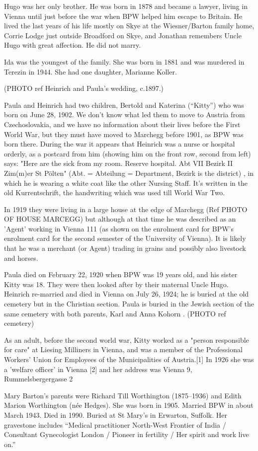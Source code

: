 Hugo was her only brother. He was born in 1878 and became a lawyer, living in Vienna until just
before the war when BPW helped him escape to Britain. He lived the last years of his life mostly
on Skye at the Wiesner/Barton family home, Corrie Lodge just outside Broadford on Skye, and
Jonathan remembers Uncle Hugo with great affection. He did not marry.

Ida was the youngest of the family. She was born in 1881 and was murdered in Terezin in 1944. She
had one daughter, Marianne Koller.

(PHOTO ref Heinrich and Paula's wedding, c.1897.)

Paula and Heinrich had two children, Bertold and Katerina (“Kitty”) who was born on June 28,
1902. We don’t know what led them to move to Austria from Czechoslovakia, and we have no
information about their lives before the First World War, but they must have moved to Marchegg
before 1901, as BPW was born there. During the war it appears that Heinrich was a nurse or
hospital orderly, as a postcard from him (showing him on the front row, second from left) says:
"Here are the sick from my room. Reserve hospital. Abt VII Bezirk II Zim(m)er St Pölten" (Abt. =
Abteilung = Department, Bezirk is the district) , in which he is wearing a white coat like the other
Nursing Staff. It's written in the old Kurrentschrift, the handwriting which was used till World War
Two.

In 1919 they were living in a large house at the edge of Marchegg (Ref PHOTO OF HOUSE
MARCEGG) but although at that time he was described as an 'Agent' working in Vienna 111 (as
shown on the enrolment card for BPW’s enrolment card for the second semester of the University
of Vienna). It is likely that he was a merchant (or Agent) trading in grains and possibly also
livestock and horses.

Paula died on February 22, 1920 when BPW was 19 years old, and his sister Kitty was 18. They
were then looked after by their maternal Uncle Hugo. Heinrich re-married and died in Vienna on
July 26, 1924; he is buried at the old cemetery but in the Christian section. Paula is buried in the
Jewish section of the same cemetery with both parents, Karl and Anna Kohorn . (PHOTO ref
cemetery)

As an adult, before the second world war, Kitty worked as a "person responsible for care" at
Liesing Milliners in Vienna, and was a member of the Professional Workers’ Union for
Employees of the Municipalities of Austria.[1] In 1926 she was a 'welfare officer' in
Vienna [2] and her address was Vienna 9, Rummelsbergergasse 2

Mary Barton's parents were Richard Till Worthington (1875–1936) and Edith Marion Worthington (née Hedges).\cite{1904WorthingtonMarriage}
She was born in 1905.
Married BPW in about March 1943.
Died in 1990.
Buried at St Mary's in Erwarton, Suffolk. Her gravestone includes
``Medical practitioner North-West Frontier of India /
Consultant Gynecologist London /
Pioneer in fertility /
Her spirit and work live on.''\cite{BartonGravestone}
